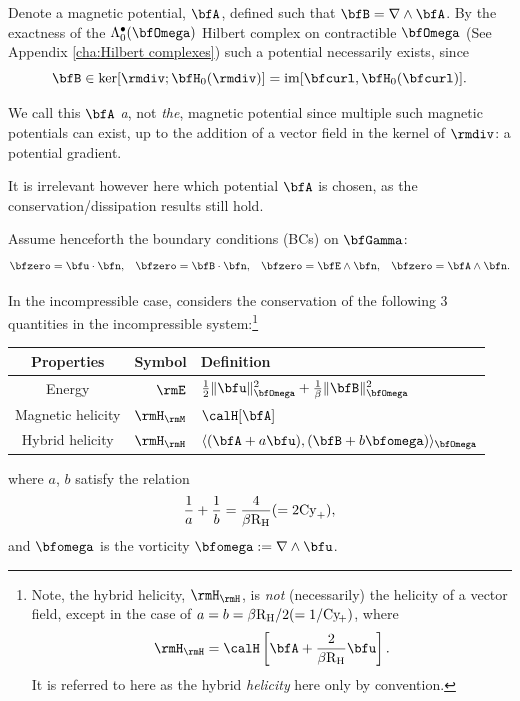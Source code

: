     Denote a magnetic potential, $\bfA$, defined such that $\bfB  =  \nabla\wedge\bfA$. By the exactness of the $\Lambda_{0}^{\bullet}(\bfOmega)$ Hilbert complex on contractible $\bfOmega$ (See Appendix \ref{cha:Hilbert complexes}) such a potential necessarily exists, since
    \begin{equation}
        \bfB  \in  \ker[\rmdiv; \bfH_{0}(\rmdiv)]  =  \im[\bfcurl, \bfH_{0}(\bfcurl)].
    \end{equation}
    
    \begin{remark}
        We call this $\bfA$ \emph{a}, not \emph{the}, magnetic potential since multiple such magnetic potentials can exist, up to the addition of a vector field in the kernel of $\rmdiv$: a potential gradient.
        
        It is irrelevant however here which potential $\bfA$ is chosen, as the conservation/dissipation results still hold.
    \end{remark}

    Assume henceforth the boundary conditions (BCs) on $\bfGamma$: 
    \begin{align}\label{eqn:canonical boundary conditions}
        \bfzero  =  \bfu\cdot\bfn,   &&
        \bfzero  =  \bfB\cdot\bfn,   &&
        \bfzero  =  \bfE\wedge\bfn,  &&
        \bfzero  =  \bfA\wedge\bfn.
    \end{align}

    In the incompressible case, \cite{Laakmann_Hu_Farrell_2022} considers the conservation of the following 3 quantities in the incompressible system:\footnote{Note, the hybrid helicity, $\rmH_{\rmH}$, is \emph{not} (necessarily) the helicity of a vector field, except in the case of $a = b = \beta\mathrm{R}_{\mathrm{H}}/2 (= 1/\mathrm{Cy}\!_{+})$, where
    \begin{equation}
        \rmH_{\rmH} = \calH\left[\bfA + \frac{2}{\beta\rmRH}\bfu\right].
    \end{equation}
    It is referred to here as the hybrid \emph{helicity} here only by convention.} 
    \begin{center}\begin{tabular}{ c | r : l }
        Properties  &  Symbol  &  Definition  \\
        \hline\hline
        Energy  &  $\rmE$  &  $\frac{1}{2}\|\bfu\|_{\bfOmega}^{2} + \frac{1}{\beta}\|\bfB\|_{\bfOmega}^{2}$  \\
        \hdashline
        Magnetic helicity \cite{Blackman_2015}  &  $\rmH_{\rmM}$  &  $\calH[\bfA]$  \\
        Hybrid helicity \cite{Subramanian_Brandenburg_2006}  &  $\rmH_{\rmH}$  &  $\langle(\bfA + a\bfu), (\bfB + b\bfomega)\rangle_{\bfOmega}$
    \end{tabular}\end{center}
    where $a$, $b$ satisfy the relation
    \begin{equation}
        \frac{1}{a} + \frac{1}{b}  =  \frac{4}{\beta\mathrm{R}_{\mathrm{H}}}  (=  2\mathrm{Cy}_{+}),
    \end{equation}
    and $\bfomega$ is the vorticity $\bfomega  :=  \nabla\wedge\bfu$.
    
